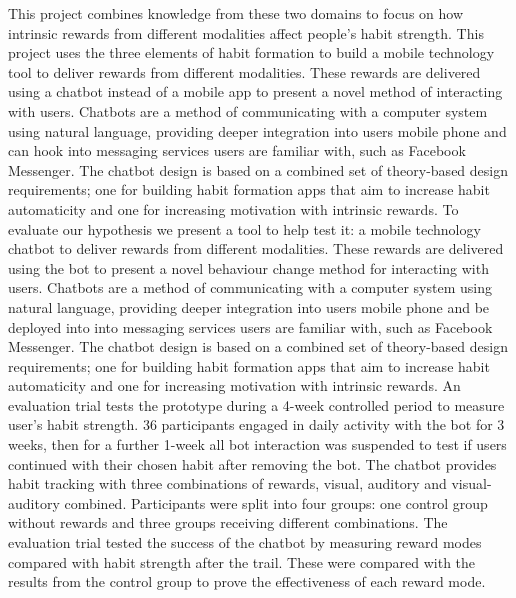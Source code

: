 This project combines knowledge from these two domains to focus on how intrinsic rewards from different modalities affect people's habit strength.\newline
\newline
This project uses the three elements of habit formation to build a mobile technology tool to deliver rewards from different modalities.
These rewards are delivered using a chatbot instead of a mobile app to present a novel method of interacting with users.
Chatbots are a method of communicating with a computer system using natural language, providing deeper integration into users mobile phone and
can hook into messaging services users are familiar with, such as Facebook Messenger.
The chatbot design is based on a combined set of theory-based design requirements;
one for building habit formation apps that aim to increase habit automaticity and one for increasing motivation with intrinsic rewards.\newline
\newline
To evaluate our hypothesis we present a tool to help test it: a mobile technology chatbot to deliver rewards from different modalities.
These rewards are delivered using the bot to present a novel behaviour change method for interacting with users.
Chatbots are a method of communicating with a computer system using natural language, providing deeper integration into users mobile phone and be deployed into into messaging services users are familiar with, such as Facebook Messenger.
The chatbot design is based on a combined set of theory-based design requirements;
one for building habit formation apps that aim to increase habit automaticity and one for increasing motivation with intrinsic rewards.\newline
\newline
An evaluation trial tests the prototype during a 4-week controlled period to measure user's habit strength.
36 participants engaged in daily activity with the bot for 3 weeks, then for a further 1-week all bot interaction was suspended to test if users continued with their chosen habit after removing the bot.
The chatbot provides habit tracking with three combinations of rewards, visual, auditory and visual-auditory combined.
Participants were split into four groups: one control group without rewards and three groups receiving different combinations.
The evaluation trial tested the success of the chatbot by measuring reward modes compared with habit strength after the trail. These were compared with the results from the control group to prove the effectiveness of each reward mode.


